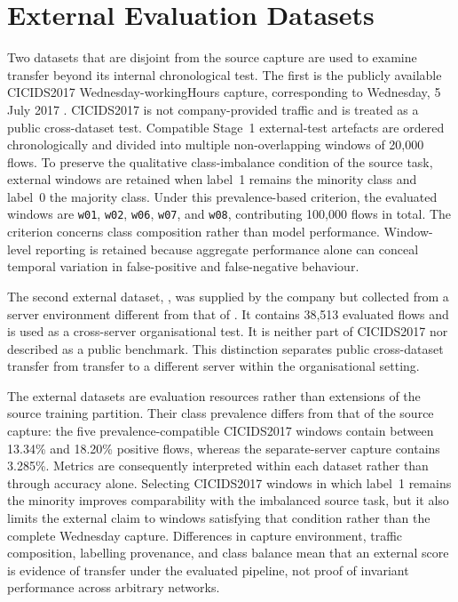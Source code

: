 \documentclass[11pt,fleqn]{report}
\begin{document}
\section{External Evaluation Datasets}
\label{subsec:external_datasets}

Two datasets that are disjoint from the source capture are used to examine transfer beyond its internal chronological test. The first is the publicly available CICIDS2017 Wednesday-workingHours capture, corresponding to Wednesday, 5 July 2017 \cite{Sharafaldin2018CICIDS}. CICIDS2017 is not company-provided traffic and is treated as a public cross-dataset test. Compatible Stage~1 external-test artefacts are ordered chronologically and divided into multiple non-overlapping windows of 20,000 flows. To preserve the qualitative class-imbalance condition of the source task, external windows are retained when label~1 remains the minority class and label~0 the majority class. Under this prevalence-based criterion, the evaluated windows are \texttt{w01}, \texttt{w02}, \texttt{w06}, \texttt{w07}, and \texttt{w08}, contributing 100,000 flows in total. The criterion concerns class composition rather than model performance. Window-level reporting is retained because aggregate performance alone can conceal temporal variation in false-positive and false-negative behaviour.

The second external dataset, , was supplied by the company but collected from a server environment different from that of . It contains 38,513 evaluated flows and is used as a cross-server organisational test. It is neither part of CICIDS2017 nor described as a public benchmark. This distinction separates public cross-dataset transfer from transfer to a different server within the organisational setting.

The external datasets are evaluation resources rather than extensions of the source training partition. Their class prevalence differs from that of the source capture: the five prevalence-compatible CICIDS2017 windows contain between 13.34\% and 18.20\% positive flows, whereas the separate-server capture contains 3.285\%. Metrics are consequently interpreted within each dataset rather than through accuracy alone. Selecting CICIDS2017 windows in which label~1 remains the minority improves comparability with the imbalanced source task, but it also limits the external claim to windows satisfying that condition rather than the complete Wednesday capture. Differences in capture environment, traffic composition, labelling provenance, and class balance mean that an external score is evidence of transfer under the evaluated pipeline, not proof of invariant performance across arbitrary networks.
\end{document}
